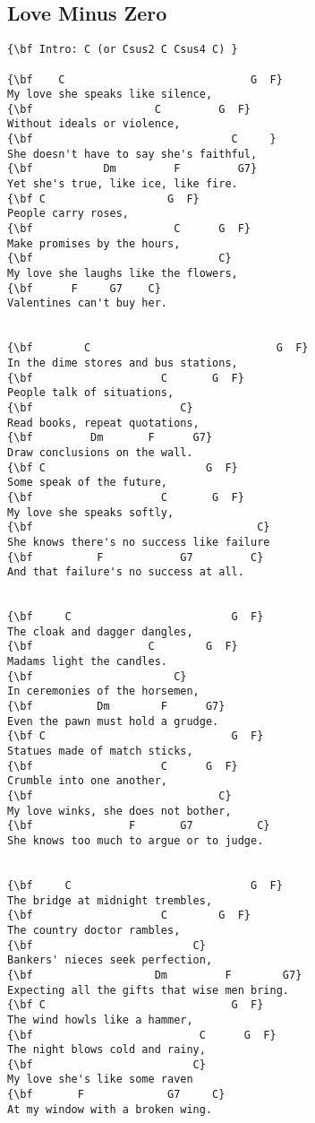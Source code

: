 \documentclass[a4paper]{article}
\begin{document}
\subsection{Love Minus Zero} %
\label{sub:Love Minus Zero}
\begin{multicols}{2}
\begin{Verbatim}[commandchars=\\\{\}]
{\bf Intro: C (or Csus2 C Csus4 C) }

{\bf    C                             G  F}
My love she speaks like silence,
{\bf                   C         G  F}
Without ideals or violence,
{\bf                               C     }
She doesn't have to say she's faithful,
{\bf           Dm         F         G7}
Yet she's true, like ice, like fire.
{\bf C                   G  F}
People carry roses,
{\bf                      C      G  F}
Make promises by the hours,
{\bf                             C}
My love she laughs like the flowers,
{\bf      F     G7    C}
Valentines can't buy her.


{\bf        C                             G  F}
In the dime stores and bus stations,
{\bf                    C       G  F}
People talk of situations,
{\bf                       C}
Read books, repeat quotations,
{\bf         Dm       F      G7}
Draw conclusions on the wall.
{\bf C                         G  F}
Some speak of the future,
{\bf                    C       G  F}
My love she speaks softly,
{\bf                                   C}
She knows there's no success like failure
{\bf          F            G7         C}
And that failure's no success at all.


{\bf     C                         G  F}
The cloak and dagger dangles,
{\bf                  C        G  F}
Madams light the candles.
{\bf                      C}
In ceremonies of the horsemen,
{\bf          Dm        F      G7}
Even the pawn must hold a grudge.
{\bf C                             G  F}
Statues made of match sticks,
{\bf                    C      G  F}
Crumble into one another,
{\bf                             C}
My love winks, she does not bother,
{\bf               F       G7          C}
She knows too much to argue or to judge.


{\bf     C                            G  F}
The bridge at midnight trembles,
{\bf                    C        G  F}
The country doctor rambles,
{\bf                         C}
Bankers' nieces seek perfection,
{\bf                   Dm         F        G7}
Expecting all the gifts that wise men bring.
{\bf C                             G  F}
The wind howls like a hammer,
{\bf                          C      G  F}
The night blows cold and rainy,
{\bf                         C}
My love she's like some raven
{\bf       F             G7     C}
At my window with a broken wing.
\end{Verbatim}
\end{multicols}
\end{document}
